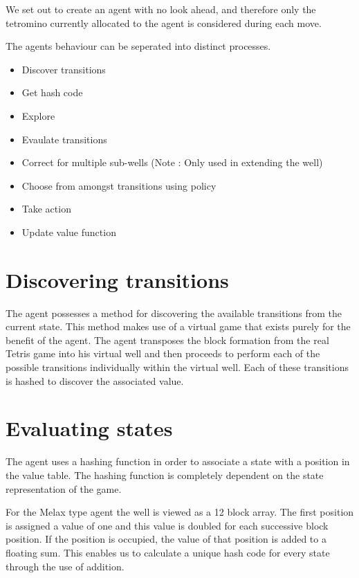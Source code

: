 \documentclass{rucsthesis}
\begin{document}
We set out to create an agent with no look ahead, and therefore only the tetromino currently allocated to the agent is considered during each move.

The agents behaviour can be seperated into distinct processes.

\begin{itemize}
\item{Discover transitions}
\item{Get hash code}
\item{Explore}
\item{Evaulate transitions}
\item{Correct for multiple sub-wells (Note : Only used in extending the well) }
\item{Choose from amongst transitions using policy}
\item{Take action}
\item{Update value function}
\end{itemize}

\section{Discovering transitions}

The agent possesses a method for discovering the available transitions from the current state. This method makes use of a virtual game that exists purely for the benefit of the agent. The agent transposes the block formation from the real Tetris game into his virtual well and then proceeds to perform each of the possible transitions individually within the virtual well. Each of these transitions is hashed to discover the associated value. 

\section{Evaluating states}

The agent uses a hashing function in order to associate a state with a position in the value table. The hashing function is completely dependent on the state representation of the game.

For the Melax type agent the well is viewed as a 12 block array. The first position is assigned a value of one and this value is doubled for each successive block position. If the position is occupied, the value of that position is added to a floating sum. This enables us to calculate a unique hash code for every state through the use of addition.
\end{document}

